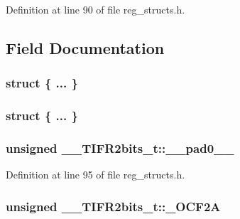 Definition at line 90 of file reg\+\_\+structs.\+h.



\subsection{Field Documentation}
\hypertarget{union_____t_i_f_r2bits__t_a8994cfef74df91513773d299394e8a58}{\subsubsection[{"@17}]{\setlength{\rightskip}{0pt plus 5cm}struct \{ ... \} }}\label{union_____t_i_f_r2bits__t_a8994cfef74df91513773d299394e8a58}
\hypertarget{union_____t_i_f_r2bits__t_aab8351b90cb47d203805a543574a5659}{\subsubsection[{"@19}]{\setlength{\rightskip}{0pt plus 5cm}struct \{ ... \} }}\label{union_____t_i_f_r2bits__t_aab8351b90cb47d203805a543574a5659}
\hypertarget{union_____t_i_f_r2bits__t_a14c9d27da086f1f8f98f120fb3782c6f}{
\subsubsection[{\+\_\+\+\_\+pad0\+\_\+\+\_\+}]{\setlength{\rightskip}{0pt plus 5cm}unsigned \+\_\+\+\_\+\+T\+I\+F\+R2bits\+\_\+t\+::\+\_\+\+\_\+pad0\+\_\+\+\_\+}}\label{union_____t_i_f_r2bits__t_a14c9d27da086f1f8f98f120fb3782c6f}


Definition at line 95 of file reg\+\_\+structs.\+h.

\hypertarget{union_____t_i_f_r2bits__t_a7aa8916f040bb31cb4394c23ac909e12}{
\subsubsection[{\+\_\+\+O\+C\+F2\+A}]{\setlength{\rightskip}{0pt plus 5cm}unsigned \+\_\+\+\_\+\+T\+I\+F\+R2bits\+\_\+t\+::\+\_\+\+O\+C\+F2\+A}}\label{union_____t_i_f_r2bits__t_a7aa8916f040bb31cb4394c23ac909e12}


